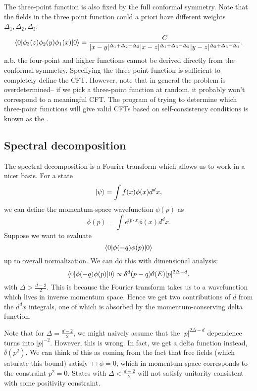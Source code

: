 The three-point function is also fixed by the full conformal symmetry. Note that the fields in the three point function could a priori have different weights $\Delta_1,\Delta_2,\Delta_3$:
\begin{equation}
    \langle0\rvert \phi_3(z) \phi_2(y) \phi_1(x) \lvert0\rangle = \frac{C}{|x-y|^{\Delta_1 +\Delta_2 -\Delta_3}|x-z|^{\Delta_1+\Delta_3 -\Delta_2} |y-z|^{\Delta_2+\Delta_3 - \Delta_1}}.
\end{equation}
n.b. the four-point and higher functions cannot be derived directly from the conformal symmetry. Specifying the three-point function is sufficient to completely define the CFT. However, note that in general the problem is overdetermined-- if we pick a three-point function at random, it probably won't correspond to a meaningful CFT. The program of trying to determine which three-point functions will give valid CFTs based on self-consistency conditions is known as the .

\subsection*{Spectral decomposition} The spectral decomposition is a Fourier transform which allows us to work in a nicer basis. For a state
\begin{equation}
    \lvert\psi\rangle=\int f(x) \phi(x) d^dx,
\end{equation}
we can define the momentum-space wavefunction $\phi(p)$ as
\begin{equation}
    \phi(p)=\int e^{ip \cdot x} \phi(x) d^dx.
\end{equation}
Suppose we want to evaluate
\begin{equation}
    \langle0\rvert \phi(-q) \phi(p)\lvert0\rangle
\end{equation}
up to overall normalization. We can do this with dimensional analysis:
\begin{equation}
    \langle0\rvert \phi(-q) \phi(p)\lvert0\rangle \propto \delta^d(p-q) \theta(E) |p|^{2\Delta -d},
\end{equation}
with $\Delta > \frac{d-2}{2}$. This is because the Fourier transform takes us to a wavefunction which lives in inverse momentum space. Hence we get two contributions of $d$ from the $d^dx$ integrals, one of which is absorbed by the momentum-conserving delta function.

Note that for $\Delta = \frac{d-2}{2}$, we might naively assume that the $|p|^{2\Delta-d}$ dependence turns into $|p|^{-2}$. However, this is wrong. In fact, we get a delta function instead, $\delta(p^2)$. We can think of this as coming from the fact that free fields (which saturate this bound) satisfy $\Box \phi=0$, which in momentum space corresponds to the constraint $p^2=0$. States with $\Delta<\frac{d-2}{2}$ will not satisfy unitarity consistent with some positivity constraint.

